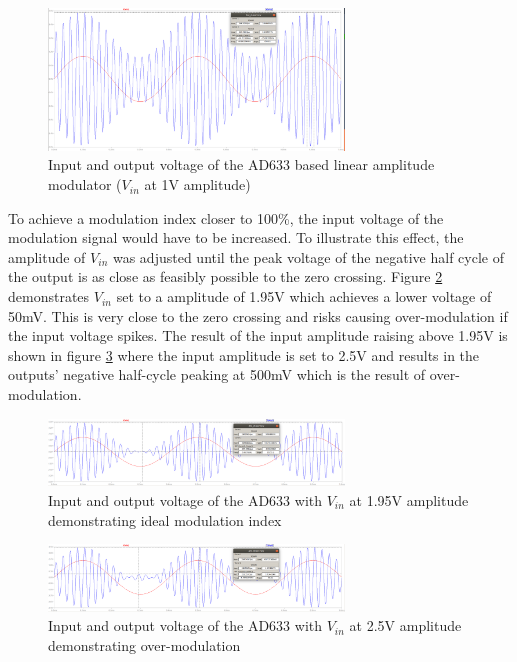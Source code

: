 \begin{figure}[ht!]
    \centering
    \includegraphics[width=0.7\textwidth]{Figures/Design/Mixer/mixerVinVoutFc.png}
    \caption{Input and output voltage of the AD633 based linear amplitude modulator ($V_{in}$ at 1V amplitude)}
    \label{fig:mixervinvout}
\end{figure}

To achieve a modulation index closer to 100\%, the input voltage of the modulation signal would have to be increased. To illustrate this effect, the amplitude of $V_{in}$ was adjusted until the peak voltage of the negative half cycle of the output is as close as feasibly possible to the zero crossing. Figure \ref{fig:mixervin195} demonstrates $V_{in}$ set to a amplitude of 1.95V which achieves a lower voltage of 50mV. This is very close to the zero crossing and risks causing over-modulation if the input voltage spikes. The result of the input amplitude raising above 1.95V is shown in figure \ref{fig:mixervin25} where the input amplitude is set to 2.5V and results in the outputs' negative half-cycle peaking at 500mV which is the result of over-modulation.

\begin{figure}[ht!]
    \centering
    \includegraphics[width=0.7\textwidth]{Figures/Design/Mixer/195Vm10Vc.png}
    \caption{Input and output voltage of the AD633 with $V_{in}$ at 1.95V amplitude demonstrating ideal modulation index}
    \label{fig:mixervin195}
\end{figure}

\begin{figure}[ht!]
    \centering
    \includegraphics[width=0.7\textwidth]{Figures/Design/Mixer/25Vm10VcOvermod.png}
    \caption{Input and output voltage of the AD633 with $V_{in}$ at 2.5V amplitude demonstrating over-modulation}
    \label{fig:mixervin25}
\end{figure}

